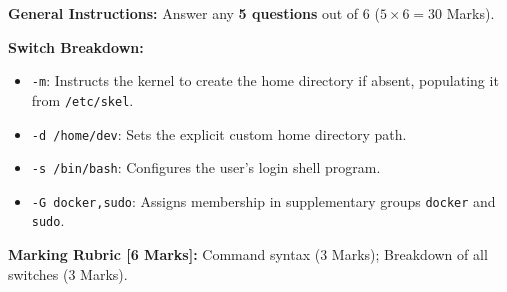 
\begin{markingrubric}
\textbf{General Instructions:} Answer any \textbf{5 questions} out of 6 ($5 \times 6 = 30$ Marks).
\end{markingrubric}


\begin{examsol}
\textbf{Switch Breakdown:}
\begin{itemize}[leftmargin=1.5em]
    \item \texttt{-m}: Instructs the kernel to create the home directory if absent, populating it from \texttt{/etc/skel}.
    \item \texttt{-d /home/dev}: Sets the explicit custom home directory path.
    \item \texttt{-s /bin/bash}: Configures the user's login shell program.
    \item \texttt{-G docker,sudo}: Assigns membership in supplementary groups \texttt{docker} and \texttt{sudo}.
\end{itemize}

\begin{markingrubric}
\textbf{Marking Rubric [6 Marks]:} Command syntax (3 Marks); Breakdown of all switches (3 Marks).
\end{markingrubric}
\end{examsol}


